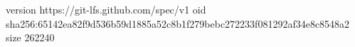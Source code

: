 version https://git-lfs.github.com/spec/v1
oid sha256:65142ea82f9d536b59d1885a52c8b1f279bebc272233f081292af34e8c8548a2
size 262240
